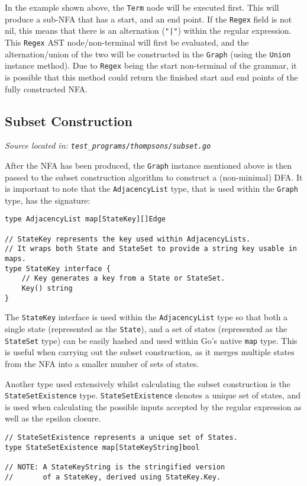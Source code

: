 In the example shown above, the \verb|Term| node will be executed first. This will produce a sub-NFA that has a start, and an end point. If the \verb|Regex| field is not nil, this means that there is an alternation (\verb+"|"+) within the regular expression. This \verb|Regex| AST node/non-terminal will first be evaluated, and the alternation/union of the two will be constructed in the \verb|Graph| (using the \verb|Union| instance method). Due to \verb|Regex| being the start non-terminal of the grammar, it is possible that this method could return the finished start and end points of the fully constructed NFA.

\subsection{Subset Construction}
\cprotect\textit{Source located in: \verb|test_programs/thompsons/subset.go|}

After the NFA has been produced, the \verb|Graph| instance mentioned above is then passed to the subset construction algorithm to construct a (non-minimal) DFA. It is important to note that the \verb|AdjacencyList| type, that is used within the \verb|Graph| type, has the signature:

\begin{verbatim}
type AdjacencyList map[StateKey][]Edge

// StateKey represents the key used within AdjacencyLists.
// It wraps both State and StateSet to provide a string key usable in maps.
type StateKey interface {
	// Key generates a key from a State or StateSet.
	Key() string
}
\end{verbatim}

The \verb|StateKey| interface is used within the \verb|AdjacencyList| type so that both a single state (represented as the \verb|State|), and a set of states (represented as the \verb|StateSet| type) can be easily hashed and used within Go's native \texttt{map} type. This is useful when carrying out the subset construction, as it merges multiple states from the NFA into a smaller number of sets of states.

Another type used extensively whilst calculating the subset construction is the \verb|StateSetExistence| type. \verb|StateSetExistence| denotes a unique set of states, and is used when calculating the possible inputs accepted by the regular expression as well as the epsilon closure.

\begin{verbatim}
// StateSetExistence represents a unique set of States.
type StateSetExistence map[StateKeyString]bool

// NOTE: A StateKeyString is the stringified version 
//       of a StateKey, derived using StateKey.Key.
\end{verbatim}

